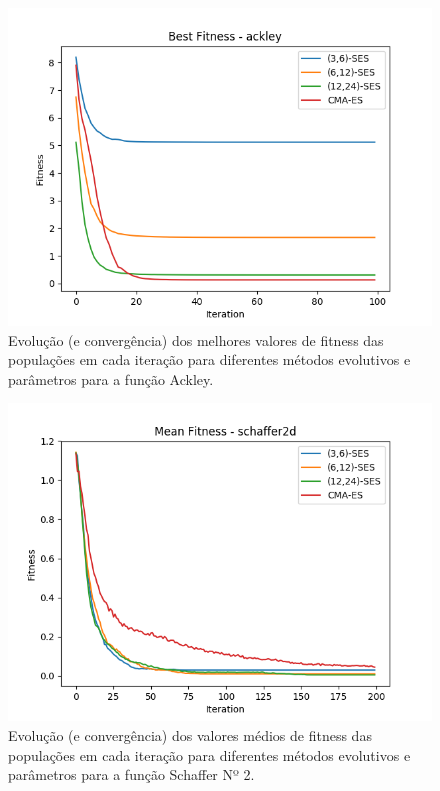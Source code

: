 \documentclass[conference]{IEEEtran}
\begin{document}
\begin{figure}[htbp]
\centering
\centerline{\includegraphics[scale=0.5]{imagens/ackley/best_fitness.png}}
\caption{Evolução (e convergência) dos melhores valores de fitness das populações em cada iteração para diferentes métodos evolutivos e parâmetros para a função Ackley.}
\label{ackley/best_fitness}
\end{figure}

\begin{figure}[htbp]
\centering
\centerline{\includegraphics[scale=0.5]{imagens/schaffer2d/mean_fitness.png}}
\caption{Evolução (e convergência) dos valores médios de fitness das populações em cada iteração para diferentes métodos evolutivos e parâmetros para a função Schaffer Nº 2.}
\label{schaffer2d/mean_fitness}
\end{figure}
\end{document}
